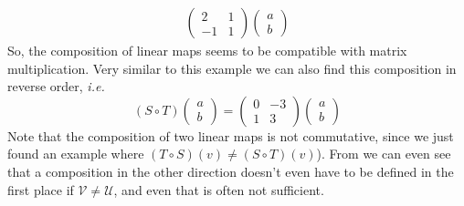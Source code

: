 \begin{exm}
\begin{align*}
\begin{pmatrix}
			2  & 1 \\
			-1 & 1
		\end{pmatrix}\begin{pmatrix}
			a \\ b
		\end{pmatrix}
	\end{align*}
	So, the composition of linear maps seems to be compatible with matrix multiplication.
	Very similar to this example we can also find this composition in reverse order, \textit{i.e.}
	\begin{equation*}
		(S \circ T)\begin{pmatrix}
			a \\ b
		\end{pmatrix}=\begin{pmatrix}
			0 & -3 \\
			1 & 3
		\end{pmatrix}\begin{pmatrix}
			a \\ b
		\end{pmatrix}
	\end{equation*}
	Note that the composition of two linear maps is not commutative, since we just
	found an example where $(T \circ S)(v) \neq (S \circ T)(v)$). From
	 we can even see that a
	composition in the other direction doesn't even have to be defined in the first
	place if $\mathcal{V}\neq\mathcal{U}$, and even that is often not sufficient.
\end{exm}


